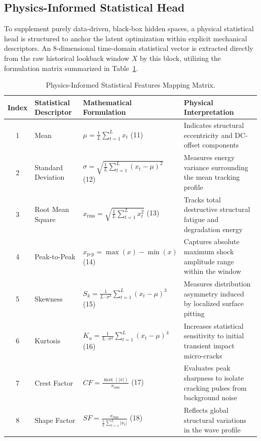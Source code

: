 \documentclass[runningheads]{llncs}
\begin{document}
\subsection{Physics-Informed Statistical Head} \label{sect:s3dot4}
To supplement purely data-driven, black-box hidden spaces, a physical statistical head is structured to anchor the latent optimization within explicit mechanical descriptors. An 8-dimensional time-domain statistical vector is extracted directly from the raw historical lookback window $X$ by this block, utilizing the formulation matrix summarized in Table~\ref{tabref:table-2}.

\begin{table}[htbp] 
\caption{Physics-Informed Statistical Features Mapping Matrix.}
\label{tabref:table-2}
\centering
\scriptsize
\renewcommand{\arraystretch}{1.2}
\begin{tabular}{cp{2.8cm}p{4.0cm}p{4.8cm}}
\toprule
\textbf{Index} & \textbf{Statistical Descriptor} & \textbf{Mathematical Formulation} & \textbf{Physical Interpretation} \\ \midrule
1 & Mean & $\mu = \frac{1}{L} \sum_{t=1}^{L} x_t$ \hfill (11) & Indicates structural eccentricity and DC-offset components \\
2 & Standard Deviation & $\sigma = \sqrt{\frac{1}{L} \sum_{t=1}^{L} (x_t - \mu)^2}$ \hfill (12) & Measures energy variance surrounding the mean tracking profile \\
3 & Root Mean Square & $x_{\text{rms}} = \sqrt{\frac{1}{L} \sum_{t=1}^{L} x_t^2}$ \hfill (13) & Tracks total destructive structural fatigue and degradation energy \\
4 & Peak-to-Peak & $x_{\text{p-p}} = \max(x) - \min(x)$ \hfill (14) & Captures absolute maximum shock amplitude range within the window \\
5 & Skewness & $S_k = \frac{1}{L \cdot \sigma^3} \sum_{t=1}^{L} (x_t - \mu)^3$ \hfill (15) & Measures distribution asymmetry induced by localized surface pitting \\
6 & Kurtosis & $K_u = \frac{1}{L \cdot \sigma^4} \sum_{t=1}^{L} (x_t - \mu)^4$ \hfill (16) & Increases statistical sensitivity to initial transient impact micro-cracks \\
7 & Crest Factor & $CF = \frac{\max(|x|)}{x_{\text{rms}}}$ \hfill (17) & Evaluates peak sharpness to isolate cracking pulses from background noise \\
8 & Shape Factor & $SF = \frac{x_{\text{rms}}}{\frac{1}{L} \sum_{t=1}^{L} |x_t|}$ \hfill (18) & Reflects global structural variations in the wave profile \\ \bottomrule
\end{tabular}
\end{table}
\end{document}
